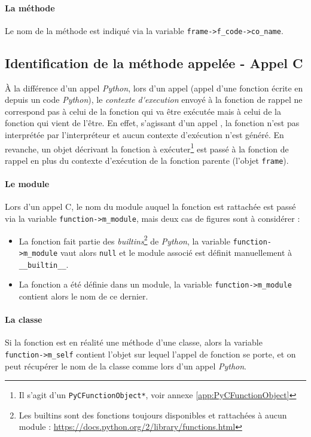 \paragraph*{La méthode} Le nom de la méthode est indiqué via la variable \verb|frame->f_code->co_name|.

\subsection{Identification de la méthode appelée - Appel C}
À la différence d'un appel \emph{Python}, lors d'un appel \C (appel d'une fonction écrite en \C depuis un code \emph{Python}), le \emph{\gls{contexte d'execution}} envoyé à la fonction de rappel ne correspond pas à celui de la fonction qui va être exécutée mais à celui de la fonction qui vient de l'être. En effet, s'agissant d'un appel \C, la fonction n'est pas interprétée par l'interpréteur \Python et aucun contexte d'exécution n'est généré. En revanche, un objet décrivant la fonction \C à exécuter\footnote{Il s'agit d'un \verb?PyCFunctionObject*?, voir annexe \vref{app:PyCFunctionObject}} est passé à la fonction de rappel en plus du contexte d'exécution de la fonction parente (l'objet \verb|frame|).

\paragraph*{Le module} Lors d'un appel C, le nom du module auquel la fonction est rattachée est passé via la variable \verb|function->m_module|, mais deux cas de figures sont à considérer : 
\begin{itemize}
\item La fonction fait partie des \emph{builtins}\footnote{Les builtins sont des fonctions toujours disponibles et rattachées à aucun module : \url{https://docs.python.org/2/library/functions.html}} de \emph{Python}, la variable \verb|function->m_module| vaut alors \verb|null| et le module associé est définit manuellement à \verb|__builtin__|.
\item La fonction a été définie dans un module, la variable \verb|function->m_module| contient alors le nom de ce dernier.
\end{itemize}

\paragraph*{La classe} Si la fonction est en réalité une méthode d'une classe, alors la variable\\ \verb|function->m_self| contient l'objet sur lequel l'appel de fonction se porte, et on peut récupérer le nom de la classe comme lors d'un appel \emph{Python}.

